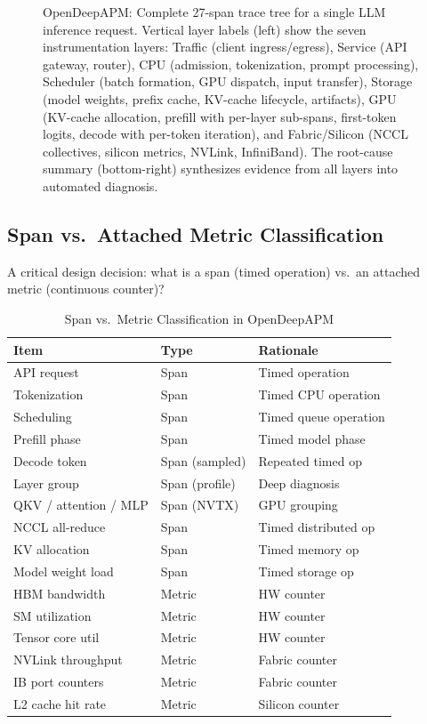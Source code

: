 \documentclass[conference,10pt]{IEEEtran}
\begin{document}
\begin{figure}[!htbp]
\begin{tikzpicture}
\end{tikzpicture}
\caption{OpenDeepAPM: Complete 27-span trace tree for a single LLM inference request. Vertical layer labels (left) show the seven instrumentation layers: Traffic (client ingress/egress), Service (API gateway, router), CPU (admission, tokenization, prompt processing), Scheduler (batch formation, GPU dispatch, input transfer), Storage (model weights, prefix cache, KV-cache lifecycle, artifacts), GPU (KV-cache allocation, prefill with per-layer sub-spans, first-token logits, decode with per-token iteration), and Fabric/Silicon (NCCL collectives, silicon metrics, NVLink, InfiniBand). The root-cause summary (bottom-right) synthesizes evidence from all layers into automated diagnosis.}
\label{fig:trace}
\end{figure}

\subsection{Span vs.\ Attached Metric Classification}

A critical design decision: what is a span (timed operation) vs.\ an attached metric (continuous counter)?

\begin{table}[!htbp]
\caption{Span vs.\ Metric Classification in OpenDeepAPM}
\label{tab:spanmetric}
\centering\footnotesize
\begin{tabular}{@{}lll@{}}
\toprule
\textbf{Item} & \textbf{Type} & \textbf{Rationale} \\
\midrule
API request & Span & Timed operation \\
Tokenization & Span & Timed CPU operation \\
Scheduling & Span & Timed queue operation \\
Prefill phase & Span & Timed model phase \\
Decode token & Span (sampled) & Repeated timed op \\
Layer group & Span (profile) & Deep diagnosis \\
QKV / attention / MLP & Span (NVTX) & GPU grouping \\
NCCL all-reduce & Span & Timed distributed op \\
KV allocation & Span & Timed memory op \\
Model weight load & Span & Timed storage op \\
\midrule
HBM bandwidth & Metric & HW counter \\
SM utilization & Metric & HW counter \\
Tensor core util & Metric & HW counter \\
NVLink throughput & Metric & Fabric counter \\
IB port counters & Metric & Fabric counter \\
L2 cache hit rate & Metric & Silicon counter \\
\bottomrule
\end{tabular}
\end{table}
\end{document}

